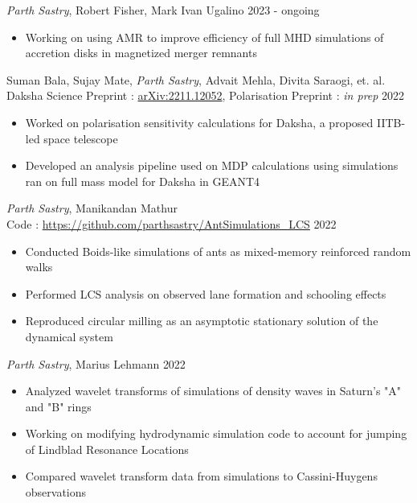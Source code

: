 {
    \emph{Parth Sastry}, Robert Fisher, Mark Ivan Ugalino
}
{
    2023 - ongoing
}
{
    \begin{itemize}
        \item Working on using AMR to improve efficiency of full MHD simulations of accretion disks in magnetized merger remnants
    \end{itemize}
}

{
    Suman Bala, Sujay Mate, \emph{Parth Sastry}, Advait Mehla, Divita Saraogi, et. al. \\
    Daksha Science Preprint : \href{https://arxiv.org/abs/2211.12052}{arXiv:2211.12052}, Polarisation Preprint : \textit{in prep}
}
{
    2022
}
{
    \begin{itemize}
        \item Worked on polarisation sensitivity calculations for Daksha, a proposed IITB-led space telescope
        \item Developed an analysis pipeline used on MDP calculations using simulations ran on full mass model for Daksha in GEANT4
    \end{itemize}
}

{
    \emph{Parth Sastry}, Manikandan Mathur \\
    Code : \href{https://github.com/parthsastry/AntSimulations_LCS}{https://github.com/parthsastry/AntSimulations\_LCS}
}
{
    2022
}
{
    \begin{itemize}
        \item Conducted Boids-like simulations of ants as mixed-memory reinforced random walks
        \item Performed LCS analysis on observed lane formation and schooling effects
        \item Reproduced circular milling as an asymptotic stationary solution of the dynamical system
    \end{itemize}
}

{
    \emph{Parth Sastry}, Marius Lehmann
}
{
    2022
}
{
    \begin{itemize}
        \item Analyzed wavelet transforms of simulations of density waves in Saturn's "A" and "B" rings
        \item Working on modifying hydrodynamic simulation code to account for jumping of Lindblad Resonance Locations
        \item Compared wavelet transform data from simulations to Cassini-Huygens observations
    \end{itemize}
}
